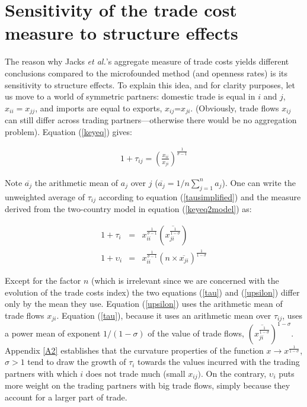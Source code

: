 \documentclass{article}
\begin{document}
\section{\label{3} Sensitivity of the trade cost measure to
structure effects}

The reason why Jacks \textit{et al.}'s aggregate measure of trade costs yields different conclusions compared to the microfounded method (and openness rates) is its sensitivity to structure
effects. To explain this idea, and for clarity purposes, let us move to a world of symmetric partners: domestic trade is equal in $i$ and $j$, $x_{ii}=x_{jj}$, and imports are equal to exports, $x_{ij}$=$x_{ji}$. (Obviously, trade flows $x_{ij}$ can still differ across trading partners---otherwise there would be no aggregation problem). Equation (\ref{keyeq}) gives: 

\begin{eqnarray}
1+\tau_{ij}= \left(\frac{x_{ii}}{x_{ji}}\right)^{\frac{1}{\sigma-1}}\label{tausimplified}
\end{eqnarray}

Note $\overline{a_j}$ the arithmetic mean
of $a_j$ over $j$ ($\overline{a_j}=1/n \sum_{j=1}^{n}a_j$). One can
write the unweighted average of $\tau_{ij}$ according to equation 
(\ref{tausimplified}) and the measure derived from the
two-country model in equation (\ref{keyeq2model}) as:

\begin{eqnarray}
1+\tau_i&=& x_{ii}^{\frac{1}{\sigma-1}} \left(\overline{{x_{ji}^{\frac{1}{1-\sigma}}}}\right) \label{tau}\\
1+\upsilon_i&=&x_{ii}^{\frac{1}{\sigma-1}} (n \times \overline{x_{ji}})^{\frac{1}{1-\sigma}}\label{upsilon}
\end{eqnarray}

Except for the factor $n$ (which is irrelevant since we are concerned with the evolution of the trade costs index) the two equations (\ref{tau}) and (\ref{upsilon}) differ only by the mean they use.
Equation (\ref{upsilon}) uses the arithmetic mean of trade flows $x_{ji}$. Equation (\ref{tau}), because it uses an arithmetic mean over $\tau_{ij}$, uses a power mean of exponent  $1/(1-\sigma)$ of the value of trade flows, $\left(\overline{x_{ji}^{\frac{1}{1-\sigma}}}\right)^{1-\sigma}$.
Appendix \ref{A2} establishes that the curvature properties of the function $x \rightarrow x^{\frac{1}{1-\sigma}}$, $\sigma>1$ tend to draw the growth of $\tau_i$ towards the values incurred with the trading partners with which $i$ does not trade much (small $x_{ij})$.
On the contrary, $\upsilon_i$ puts more weight on the trading partners with big trade flows, simply because they account for a larger part of trade.
\end{document}
